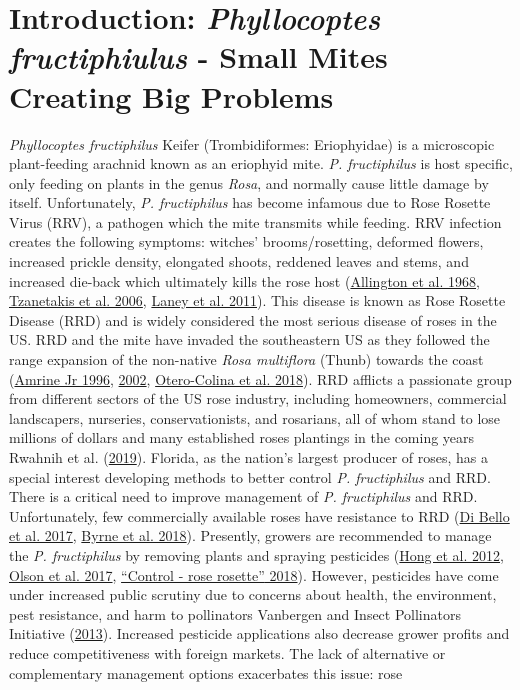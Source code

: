 \documentclass{ufdissertation}[overrideChapters] %
\begin{document}
{\hypertarget{introduction-phyllocoptes-fructiphiulus---small-mites-creating-big-problems}{%
\section{\texorpdfstring{Introduction: \emph{Phyllocoptes fructiphiulus} - Small Mites Creating Big Problems}{Introduction: Phyllocoptes fructiphiulus - Small Mites Creating Big Problems}}\label{introduction-phyllocoptes-fructiphiulus---small-mites-creating-big-problems}}

\emph{Phyllocoptes fructiphilus} Keifer (Trombidiformes: Eriophyidae) is a microscopic plant-feeding arachnid known as an eriophyid mite. \emph{P. fructiphilus} is host specific, only feeding on plants in the genus \emph{Rosa}, and normally cause little damage by itself. Unfortunately, \emph{P. fructiphilus} has become infamous due to Rose Rosette Virus (RRV), a pathogen which the mite transmits while feeding. RRV infection creates the following symptoms: witches' brooms/rosetting, deformed flowers, increased prickle density, elongated shoots, reddened leaves and stems, and increased die-back which ultimately kills the rose host (\protect\hyperlink{ref-Allington1968}{Allington et al. 1968}, \protect\hyperlink{ref-Tzanetakis2006}{Tzanetakis et al. 2006}, \protect\hyperlink{ref-Laney2011}{Laney et al. 2011}). This disease is known as Rose Rosette Disease (RRD) and is widely considered the most serious disease of roses in the US. RRD and the mite have invaded the southeastern US as they followed the range expansion of the non-native \emph{Rosa multiflora} (Thunb) towards the coast (\protect\hyperlink{ref-Amrine1996}{Amrine Jr 1996}, \protect\hyperlink{ref-Amrine2002}{2002}, \protect\hyperlink{ref-Otero-Colina2018}{Otero-Colina et al. 2018}). RRD afflicts a passionate group from different sectors of the US rose industry, including homeowners, commercial landscapers, nurseries, conservationists, and rosarians, all of whom stand to lose millions of dollars and many established roses plantings in the coming years Rwahnih et al. (\protect\hyperlink{ref-Rwahnih2019}{2019}). Florida, as the nation's largest producer of roses, has a special interest developing methods to better control \emph{P. fructiphilus} and RRD. There is a critical need to improve management of \emph{P. fructiphilus} and RRD. Unfortunately, few commercially available roses have resistance to RRD (\protect\hyperlink{ref-Bello2017}{Di Bello et al. 2017}, \protect\hyperlink{ref-Byrne2018}{Byrne et al. 2018}). Presently, growers are recommended to manage the \emph{P. fructiphilus} by removing plants and spraying pesticides (\protect\hyperlink{ref-Hong2012}{Hong et al. 2012}, \protect\hyperlink{ref-Olson2017}{Olson et al. 2017}, \protect\hyperlink{ref-UGA2018}{{``Control - rose rosette''} 2018}). However, pesticides have come under increased public scrutiny due to concerns about health, the environment, pest resistance, and harm to pollinators Vanbergen and Insect Pollinators Initiative (\protect\hyperlink{ref-Vanbergen2013}{2013}). Increased pesticide applications also decrease grower profits and reduce competitiveness with foreign markets. The lack of alternative or complementary management options exacerbates this issue: rose }
\end{document}
